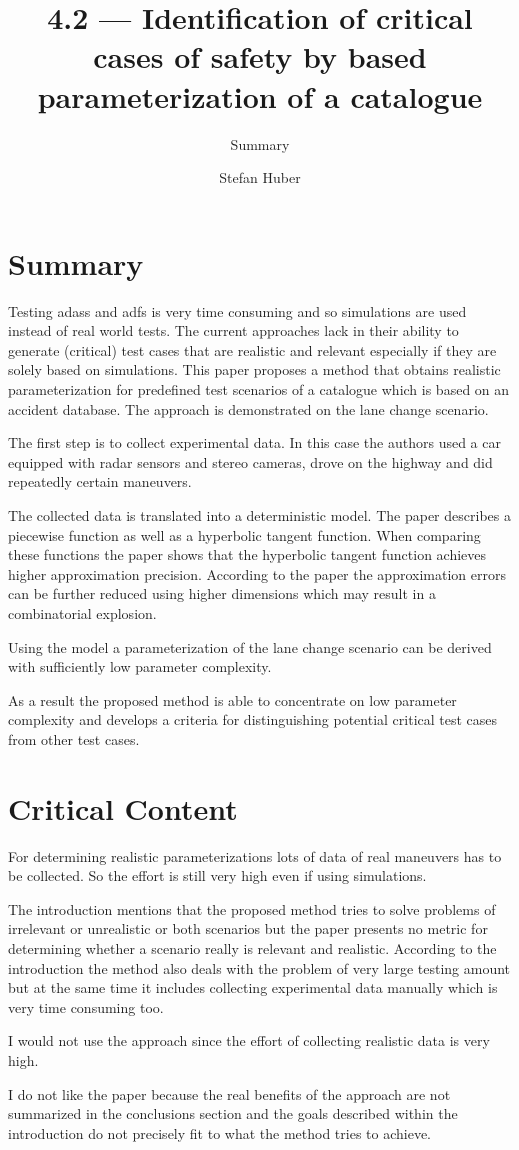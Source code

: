\documentclass[oneside, notitlepage, twocolumn]{scrartcl}
\title{\LARGE 4.2 --- Identification of critical cases of \glstext{adas} safety by \glstext{fot} based parameterization of a catalogue}
\subtitle{Summary}
\author{Stefan Huber}
\begin{document}
\maketitle

\section{Summary}
Testing \glspl{adas} and \glspl{adf} is very time consuming and so simulations are used instead of real world tests.
The current approaches lack in their ability to generate (critical) test cases that are realistic and relevant especially if they are solely based on simulations.
This paper proposes a method that obtains realistic parameterization for predefined test scenarios of a catalogue which is based on an accident database.
The approach is demonstrated on the lane change scenario.\par
The first step is to collect experimental data.
In this case the authors used a car equipped with radar sensors and stereo cameras, drove on the highway and did repeatedly certain maneuvers.\par
The collected data is translated into a deterministic model.
The paper describes a piecewise function as well as a hyperbolic tangent function.
When comparing these functions the paper shows that the hyperbolic tangent function achieves higher approximation precision.
According to the paper the approximation errors can be further reduced using higher dimensions which may result in a combinatorial explosion.\par
Using the model a parameterization of the lane change scenario can be derived with sufficiently low parameter complexity.\par
As a result the proposed method is able to concentrate on low parameter complexity and develops a criteria for distinguishing potential critical test cases from other test cases.

\section{Critical Content}
For determining realistic parameterizations lots of data of real maneuvers has to be collected.
So the effort is still very high even if using simulations.\par
The introduction mentions that the proposed method tries to solve problems of irrelevant or unrealistic or both scenarios but the paper presents no metric for determining whether a scenario really is relevant and realistic.
According to the introduction the method also deals with the problem of very large testing amount but at the same time it includes collecting experimental data manually which is very time consuming too.\par
I would not use the approach since the effort of collecting realistic data is very high.\par
I do not like the paper because the real benefits of the approach are not summarized in the conclusions section and the goals described within the introduction do not precisely fit to what the method tries to achieve.
\end{document}
